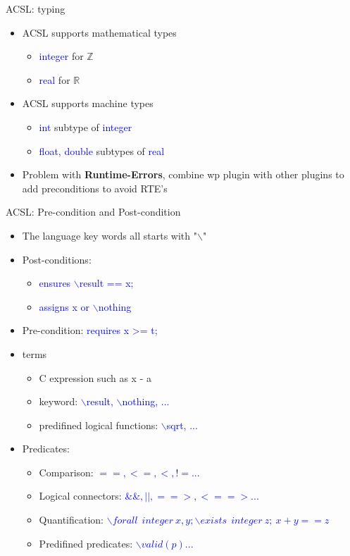 \begin{frame}{ACSL: typing}
\begin{itemize}
	\item ACSL supports mathematical types
	\begin{itemize}
		\item  \textcolor{blue}{integer} for $\mathbb{Z}$
		\item  \textcolor{blue}{real} for $\mathbb{R}$
	\end{itemize}
	\item ACSL supports machine types
\begin{itemize}
	\item  \textcolor{blue}{int} subtype of \textcolor{blue}{integer} 
	\item  \textcolor{blue}{float}, \textcolor{blue}{double} subtypes of \textcolor{blue}{real}
\end{itemize}
\item Problem with \textbf{Runtime-Errors}, combine wp plugin with other plugins to add preconditions to avoid RTE's 
	
\end{itemize}
\end{frame}

\begin{frame}{ACSL: Pre-condition and Post-condition}
\begin{itemize}
	\item The language key words all starts with "$\backslash$"
	\item Post-conditions:
	\begin{itemize}
		\item \textcolor{blue}{ensures $\backslash$result == x;}
		\item \textcolor{blue}{assigns x or $\backslash$nothing }
	\end{itemize}
       \item Pre-condition: \textcolor{blue}{requires x >= t;}

\item terms
\begin{itemize}
	\item C expression such as x - a
	\item keyword: \textcolor{blue}{$\backslash$result, $\backslash$nothing, ...}
	\item predifined logical functions: \textcolor{blue}{$\backslash$sqrt, ...}

\end{itemize}
\item Predicates:
\begin{itemize}
	\item Comparison: \textcolor{blue}{$==, <= , <, != ...$}
	\item Logical connectors: \textcolor{blue}{\&\&$, || , ==>, <==> ...$}
   \item Quantification: \textcolor{blue}{$\backslash forall~~ integer~ x,y; \backslash exists~~integer~z;~ x+y==z$}
   \item Predifined predicates: \textcolor{blue}{$\backslash valid(p) ...$}
\end{itemize}
\end{itemize}
\end{frame}


